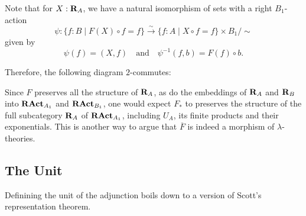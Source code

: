 \begin{remark}
  Note that for $ X : \mathbf{R}_A $, we have a natural isomorphism of sets with a right $ B_1 $-action
  \[ \psi: \{ f : B \mid F(X) \circ f = f \} \xrightarrow \sim \{ f : A \mid X \circ f = f \} \times B_1 / \sim \]
  given by
  \[ \psi(f) = (X, f) \quad \text{and} \quad \psi^{-1}(f, b) = F(f) \circ b. \]

  Therefore, the following diagram $ 2 $-commutes:
  \begin{center}
  \end{center}
  Since $ F $ preserves all the structure of $ \mathbf{R}_A $, as do the embeddings of $ \mathbf{R}_A $ and $ \mathbf{R}_B $ into $ \mathbf{RAct}_{A_1} $ and $ \mathbf{RAct}_{B_1} $, one would expect $ F_* $ to preserves the structure of the full subcategory $ \mathbf{R}_A $ of $ \mathbf{RAct}_{A_1} $, including $ U_A $, its finite products and their exponentials. This is another way to argue that $ \overline F $ is indeed a morphism of $ \lambda $-theories.
\end{remark}

\subsection{The Unit}

Definining the unit of the adjunction boils down to a version of Scott's representation theorem.

